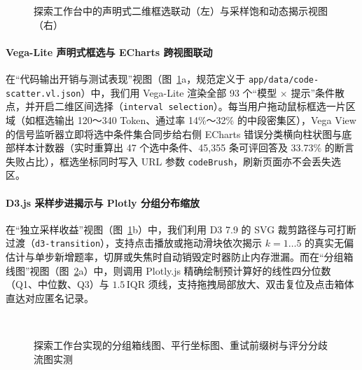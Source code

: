 \begin{figure}[!htbp]
\centering
{}\hfill
{}
\caption{探索工作台中的声明式二维框选联动（左）与采样饱和动态揭示视图（右）}
\label{fig:explore-vega-d3}
\end{figure}

\paragraph{Vega-Lite 声明式框选与 ECharts 跨视图联动}在“代码输出开销与测试表现”视图（图~\ref{fig:explore-vega-d3}a，规范定义于 \texttt{app/data/code-scatter.vl.json}）中，我们用 Vega-Lite 渲染全部 93 个“模型 $\times$ 提示”条件散点，并开启二维区间选择（\texttt{interval selection}）。每当用户拖动鼠标框选一片区域（如框选输出 120～340 Token、通过率 14\%～32\% 的中段密集区），Vega View 的信号监听器立即将选中条件集合同步给右侧 ECharts 错误分类横向柱状图与底部样本计数器（实时重算出 47 个选中条件、45,355 条可评回答及 33.73\% 的断言失败占比），框选坐标同时写入 URL 参数 \texttt{codeBrush}，刷新页面亦不会丢失选区。

\paragraph{D3.js 采样步进揭示与 Plotly 分组分布缩放}在“独立采样收益”视图（图~\ref{fig:explore-vega-d3}b）中，我们利用 D3 7.9 的 SVG 裁剪路径与可打断过渡（\texttt{d3-transition}），支持点击播放或拖动滑块依次揭示 $k=1\dots 5$ 的真实无偏估计与单步新增题率，切屏或失焦时自动销毁定时器防止内存泄漏。而在“分组箱线图”视图（图~\ref{fig:explore-plotly-echarts}a）中，则调用 Plotly.js 精确绘制预计算好的线性四分位数（Q1、中位数、Q3）与 $1.5\,\text{IQR}$ 须线，支持拖拽局部放大、双击复位及点击箱体直达对应匿名记录。

\begin{figure}[!htbp]
\centering
{}\hfill
{}\\[6pt]
\hfill
{}
\caption{探索工作台实现的分组箱线图、平行坐标图、重试前缀树与评分分歧流图实测}
\label{fig:explore-plotly-echarts}
\end{figure}

